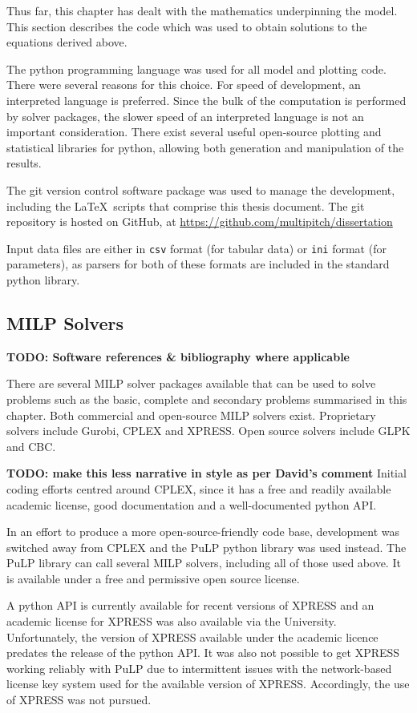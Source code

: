 Thus far, this chapter has dealt with the mathematics underpinning the model.
This section describes the code which was used to obtain solutions to the
equations derived above.

The python programming language was used for all model and plotting code.
There were several reasons for this choice.
For speed of development, an interpreted language is preferred.
Since the bulk of the computation is performed by solver packages, the slower
speed of an interpreted language is not an important consideration.
There exist several useful open-source plotting and statistical libraries for
python, allowing both generation and manipulation of the results.

The git version control software package was used to manage the development,
including the \LaTeX\ scripts that comprise this thesis document.
The git repository is hosted on GitHub, at 
\url{https://github.com/multipitch/dissertation}

Input data files are either in \texttt{csv} format (for tabular data) or
\texttt{ini} format (for parameters), as parsers for both of these formats are
included in the standard python library.

\subsection{MILP Solvers}\label{SS.impl1}

\textbf{TODO: Software references \& bibliography where applicable}

There are several MILP solver packages available that can be used to solve
problems such as the basic, complete and secondary problems summarised in this
chapter. Both commercial and open-source MILP solvers exist.
Proprietary solvers include Gurobi, CPLEX and XPRESS. Open source solvers
include GLPK and CBC.

\textbf{TODO: make this less narrative in style as per David's comment}
Initial coding efforts centred around CPLEX, since it has a free and
readily available academic license, good documentation and a well-documented
python API.

In an effort to produce a more open-source-friendly code base, development was
switched away from CPLEX and the PuLP python library was used instead.
The PuLP library can call several MILP solvers, including all of those used
above.
It is available under a free and permissive open source license.

A python API is currently available for recent versions of XPRESS and an
academic license for XPRESS was also available via the University.
Unfortunately, the version of XPRESS available under the academic licence
predates the release of the python API.
It was also not possible to get XPRESS working reliably with PuLP due to
intermittent issues with the network-based license key system used for the
available version of XPRESS.
Accordingly, the use of XPRESS was not pursued.

